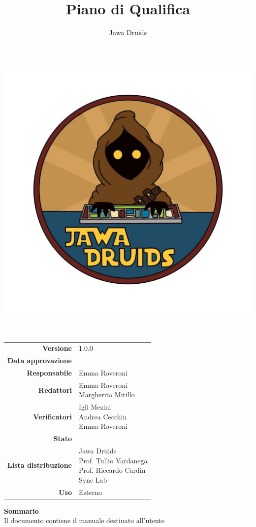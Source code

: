 



	
	\makeatletter
	\begin{titlepage}
		\begin{center}
			\vspace*{-4cm}
			\author{Jawa Druids} 
			\title{Piano di Qualifica}
			\date{} %
			\includegraphics[width=0.5\linewidth]{../immagini/DRUIDSLOGO.jpg}\\[4ex]
			{\huge \bfseries  \@title }\\[2ex] 
			{\LARGE  \@author}\\[50ex]
			\vspace*{-9cm}
			\begin{table}[H]
				\renewcommand{\arraystretch}{1.4}
				\centering
				\begin{tabular}{r | l}
					\textbf{Versione} & 1.0.0 \\%
					\textbf{Data approvazione} & \\
					\textbf{Responsabile} & Emma Roveroni\\
					\textbf{Redattori} & \makecell[tl]{ Emma Roveroni \\ Margherita Mitillo} \\
					\textbf{Verificatori} & \makecell[tl]{Igli Mezini \\ Andrea Cecchin \\ Emma Roveroni} \\
					\textbf{Stato} & \\
					\textbf{Lista distribuzione} & \makecell[tl]{Jawa Druids \\ Prof. Tullio Vardanega \\ Prof. Riccardo Cardin \\ Sync Lab}\\
					\textbf{Uso} & Esterno  
				\end{tabular}
			\end{table}
			\vspace{0.1cm}
			\hfill \break
			\fontsize{17}{10}\textbf{Sommario} \\
			\vspace{0.1cm}
			Il documento contiene il manuale destinato all'utente
		\end{center}
	\end{titlepage}
	\makeatother
	
	
	\tableofcontents{}
	\listoffigures
	\listoftables	
	
	
	
	
	
	

